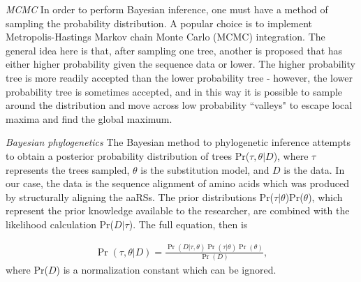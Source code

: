 \documentclass[10pt,letterpaper]{article}
\begin{document}

\textit{MCMC}
In order to perform Bayesian inference, one must have a method of sampling the probability distribution.  A popular choice is to implement Metropolis-Hastings Markov chain Monte Carlo (MCMC) integration. \cite{MCMC} \cite{Metropolis} \cite{Hastings}  
The general idea here is that, after sampling one tree, another is proposed that has either higher probability given the sequence data or lower.  The higher probability tree is more readily accepted than the lower probability tree - however, the lower probability tree is sometimes accepted, and in this way it is possible to sample around the distribution and move across low probability ``valleys" to escape local maxima and find the global maximum.  \cite{}


\textit{Bayesian phylogenetics} The Bayesian method to phylogenetic inference attempts to obtain a posterior probability distribution of trees Pr($\tau,\theta|D$), where $\tau$ represents the trees sampled, $\theta$ is the substitution model, and $D$ is the data.  In our case, the data is the sequence alignment of amino acids which was produced by structurally aligning the aaRSs.
The prior distributions Pr($\tau|\theta$)Pr($\theta$), which represent the prior knowledge available to the researcher, are combined with the likelihood calculation Pr($D|\tau$).  \cite{PPinBayesianPhylogenetics} The full equation, then is

\begin{eqnarray}
\Pr(\tau,\theta|D) = \frac{\Pr(D|\tau,\theta)\Pr(\tau|\theta)\Pr(\theta)}{\Pr(D)},
\label{eq:posterior}
\end{eqnarray}
where Pr($D$) is a normalization constant which can be ignored.


\end{document}
